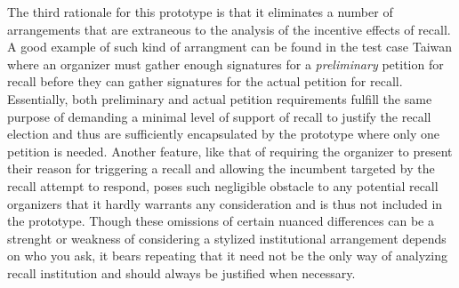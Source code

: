 \documentclass[hyphens, crop=false]{standalone}
\begin{document}
		
		The third rationale for this prototype is that it eliminates a number of arrangements
		that are extraneous to the analysis of
		the incentive effects of recall.
		A good example of such kind of arrangment can be found in the test case Taiwan where an organizer 
		must gather enough signatures for a \textit{preliminary} petition for recall
		before they can gather signatures for the actual petition for recall.
		Essentially, both preliminary and actual petition requirements
		fulfill the same purpose of demanding a minimal level of support of recall to justify the recall election
		and thus are sufficiently encapsulated by the prototype where only one petition is needed.
		Another feature, like that of requiring the organizer to present their reason for triggering a recall
		and allowing the incumbent targeted by the recall attempt to respond,
		poses such negligible obstacle to any potential recall organizers that it 
		hardly warrants any consideration and is thus not included in the prototype.
		Though these omissions of certain nuanced differences can be a strenght or weakness of considering a stylized institutional arrangement
		depends on who you ask,
		it bears repeating that it need not be the only way of analyzing recall institution
		and should always be justified when necessary.
		
\end{document}
